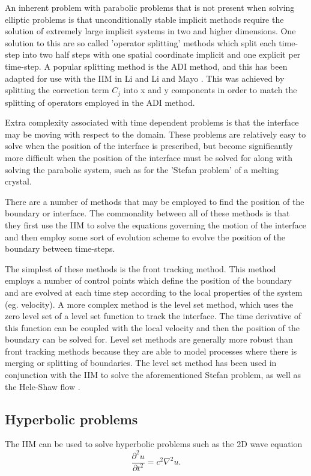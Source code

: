 An inherent problem with parabolic problems that is not present when solving elliptic problems is that unconditionally stable implicit methods require the solution of extremely large implicit systems in two and higher dimensions.
One solution to this are so called 'operator splitting' methods which split each time-step into two half steps with one spatial coordinate implicit and one explicit per time-step.
A popular splitting method is the ADI method, and this has been adapted for use with the IIM in Li \cite{li94} and Li and Mayo \cite{limayo93}.
This was achieved by splitting the correction term $C_j$ into x and y components in order to match the splitting of operators employed in the ADI method.

Extra complexity associated with time dependent problems is that the interface may be moving with respect to the domain.
These problems are relatively easy to solve when the position of the interface is prescribed, but become significantly more difficult when the position of the interface must be solved for along with solving the parabolic system, such as for the 'Stefan problem' of a melting crystal.

There are a number of methods that may be employed to find the position of the boundary or interface.
The commonality between all of these methods is that they first use the IIM to solve the equations governing the motion of the interface and then employ some sort of evolution scheme to evolve the position of the boundary between time-steps.

The simplest of these methods is the front tracking method.
This method employs a number of control points which define the position of the boundary and are evolved at each time step according to the local properties of the system (eg. velocity).
A more complex method is the level set method, which uses the zero level set of a level set function to track the interface.
The time derivative of this function can be coupled with the local velocity and then the position of the boundary can be solved for.
Level set methods are generally more robust than front tracking methods because they are able to model processes where there is merging or splitting of boundaries.
The level set method has been used in conjunction with the IIM to solve the aforementioned Stefan problem, as well as the Hele-Shaw flow \cite{liito06}.


\subsection{Hyperbolic problems}
\label{hyper}
The IIM can be used to solve hyperbolic problems such as the 2D wave equation
\begin{equation}
    \frac{\partial^2 u}{\partial t^2} = c^2 \nabla^2 u.
\end{equation}

